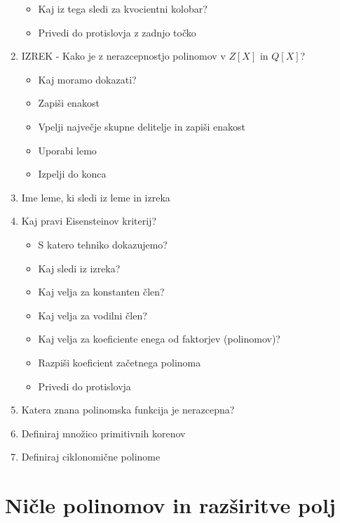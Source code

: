 \documentclass{article}
\begin{document}
\begin{enumerate}
\begin{itemize}
            \item Kaj iz tega sledi za kvocientni kolobar?
            \item Privedi do protislovja z zadnjo točko
        \end{itemize}
        \item IZREK - Kako je z nerazcepnostjo polinomov v $Z[X]$ in $Q[X]$?
        \begin{itemize}
            \item Kaj moramo dokazati?
            \item Zapiši enakost
            \item Vpelji največje skupne delitelje in zapiši enakost
            \item Uporabi lemo
            \item Izpelji do konca
        \end{itemize}
        \item Ime leme, ki sledi iz leme in izreka
        \item Kaj pravi Eisensteinov kriterij?
        \begin{itemize}
            \item S katero tehniko dokazujemo?
            \item Kaj sledi iz izreka?
            \item Kaj velja za konstanten člen?
            \item Kaj velja za vodilni člen?
            \item Kaj velja za koeficiente enega od faktorjev (polinomov)?
            \item Razpiši koeficient začetnega polinoma
            \item Privedi do protislovja
        \end{itemize}
        \item Katera znana polinomska funkcija je nerazcepna?
        \item Definiraj množico primitivnih korenov
        \item Definiraj ciklonomične polinome
    \end{enumerate}

    \section{Ničle polinomov in razširitve polj}
\end{document}

